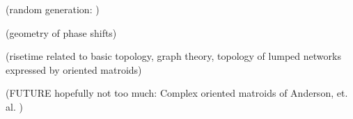 \documentclass{article}
\begin{document}
(random generation: \cite{BoltzmanSampRandCombGen})

(geometry of phase shifts)

(risetime related to basic topology, graph theory, topology of lumped
networks expressed by oriented matroids)

(FUTURE hopefully not too much: Complex oriented matroids of Anderson, et.
al. \cite{complexOM})




{}

\end{document}
